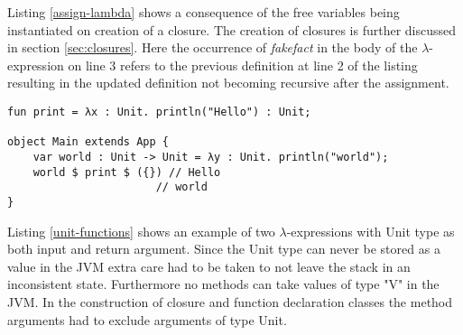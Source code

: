 Listing \ref{assign-lambda} shows a consequence of the free variables being instantiated on creation of a closure. The creation of closures is further discussed in section \ref{sec:closures}. Here the occurrence of \textit{fakefact} in the body of the $\lambda$-expression on line 3 refers to the previous definition at line 2 of the listing resulting in the updated definition not becoming recursive after the assignment.

\begin{lstlisting}[label=unit-functions,caption=Functions taking and returning values of type Unit]
fun print = λx : Unit. println("Hello") : Unit;

object Main extends App {
    var world : Unit -> Unit = λy : Unit. println("world");
    world $ print $ ({}) // Hello
                       // world
}
\end{lstlisting}

Listing \ref{unit-functions} shows an example of two $\lambda$-expressions with Unit type as both input and return argument. Since the Unit type can never be stored as a value in the JVM extra care had to be taken to not leave the stack in an inconsistent state. Furthermore no methods can take values of type "V" in the JVM. In the construction of closure and function declaration classes the method arguments had to exclude arguments of type Unit.

